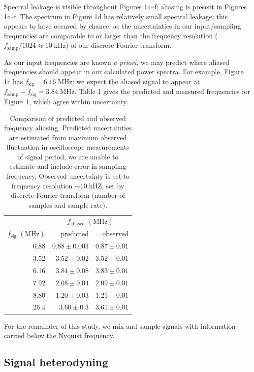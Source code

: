 \documentclass[11pt]{article}
\newcommand {\mt}{\mathrm}
\newcommand {\unit}[1]{\; \mt{#1}}
\begin{document}
Spectral leakage is visible throughout Figures 1a--f; aliasing is present in
Figures 1c--f.  The spectrum in Figure 1d has relatively small
spectral leakage; this appears to have occured by chance, as the uncertainties
in our input/sampling frequencies are comparable to or larger than the
frequency resolution ($f_{\mt{samp}} / 1024 \approx 10 \unit{kHz}$) of our
discrete Fourier transform.

As our input frequencies are known \emph{a priori}, we may predict where
aliased frequencies should appear in our calculated power spectra.
For example, Figure 1c has $f_{\mt{sig}} = 6.16 \unit{MHz}$; we expect the
aliased signal to appear at $f_{\mt{samp}} - f_{\mt{sig}} = 3.84 \unit{MHz}$.
Table 1 gives the predicted and measured frequencies for Figure 1, which agree
within uncertainty.

\begin{table}[t]
\centering
\caption{Comparison of predicted and observed frequency aliasing.
Predicted uncertainties are estimated from maximum observed fluctuation in
oscilloscope measurements of signal period; we are unable to estimate and
include error in sampling frequency.
Observed uncertainty is set to frequency resolution $\sim 10 \unit{kHZ}$, set
by discrete Fourier transform (number of samples and sample rate).}
\begin{tabular}{@{}rrr@{}}
    \toprule
    & \multicolumn{2}{c}{$f_{\mt{aliased}} \unit{(MHz)}$} \\
    \cmidrule(l){2-3}
    $f_{\mt{sig}} \unit{(MHz)}$ & predicted & observed \\
    \midrule
    0.88 & $0.88 \pm 0.003$ & $0.87 \pm 0.01$ \\
    3.52 & $3.52 \pm 0.02$ & $3.52 \pm 0.01$ \\
    6.16 & $3.84 \pm 0.08$ & $3.83 \pm 0.01$ \\
    7.92 & $2.08 \pm 0.04$ & $2.09 \pm 0.01$ \\
    8.80 & $1.20 \pm 0.03$ & $1.21 \pm 0.01$ \\
    26.4 & $3.60 \pm 0.3$ & $3.61 \pm 0.01$ \\
    \bottomrule
\end{tabular}
\end{table}

For the remainder of this study, we mix and sample signals with information
carried below the Nyquist frequency.

\subsection{Signal heterodyning}
\end{document}
